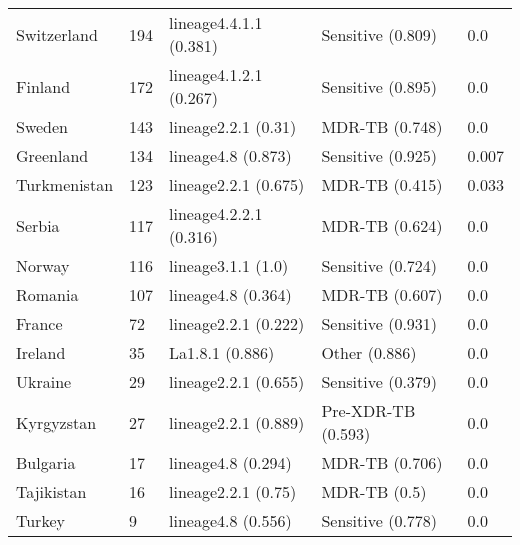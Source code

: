 \begin{tabular}{lllll}
 Switzerland                                  & 194                   & lineage4.4.1.1 (0.381)   & Sensitive (0.809)   & 0.0        \\
 Finland                                      & 172                   & lineage4.1.2.1 (0.267)   & Sensitive (0.895)   & 0.0        \\
 Sweden                                       & 143                   & lineage2.2.1 (0.31)      & MDR-TB (0.748)      & 0.0        \\
 Greenland                                    & 134                   & lineage4.8 (0.873)       & Sensitive (0.925)   & 0.007      \\
 Turkmenistan                                 & 123                   & lineage2.2.1 (0.675)     & MDR-TB (0.415)      & 0.033      \\
 Serbia                                       & 117                   & lineage4.2.2.1 (0.316)   & MDR-TB (0.624)      & 0.0        \\
 Norway                                       & 116                   & lineage3.1.1 (1.0)       & Sensitive (0.724)   & 0.0        \\
 Romania                                      & 107                   & lineage4.8 (0.364)       & MDR-TB (0.607)      & 0.0        \\
 France                                       & 72                    & lineage2.2.1 (0.222)     & Sensitive (0.931)   & 0.0        \\
 Ireland                                      & 35                    & La1.8.1 (0.886)          & Other (0.886)       & 0.0        \\
 Ukraine                                      & 29                    & lineage2.2.1 (0.655)     & Sensitive (0.379)   & 0.0        \\
 Kyrgyzstan                                   & 27                    & lineage2.2.1 (0.889)     & Pre-XDR-TB (0.593)  & 0.0        \\
 Bulgaria                                     & 17                    & lineage4.8 (0.294)       & MDR-TB (0.706)      & 0.0        \\
 Tajikistan                                   & 16                    & lineage2.2.1 (0.75)      & MDR-TB (0.5)        & 0.0        \\
 Turkey                                       & 9                     & lineage4.8 (0.556)       & Sensitive (0.778)   & 0.0        \\

\end{tabular}
